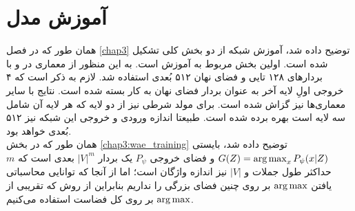 \section{آموزش مدل}
همان طور که در فصل \ref{chap3} توضیح داده شد، آموزش شبکه از دو بخش کلی تشکیل شده است. اولین بخش مربوط به آموزش \wae{} است. به این منظور از معماری \transformer{}در \encoder{} و \decoder{} با بردارهای  \embedding{} 
۱۲۸ تایی و فضای نهان ۵۱۲ بُعدی استفاده شد. لازم به ذکر است که ۴ خروجی اولِ لایه آخر \encoder{} به عنوان بردار فضای نهان به کار بسته شده است. نتایج با سایر معماری‌ها نیز گزاش شده‌ است. برای مولد شرطی نیز از دو لایه  که هر لایه آن شامل سه لایه  است بهره برده شده است. طبیعتا اندازه ورودی و خروجی این شبکه نیز ۵۱۲ بُعدی خواهد بود.
\\
همان طور که در بخش \ref{chap3:wae_training} توضیح داده شد، \decoder{} بایستی 
$G(Z) = \operatorname*{arg\,max}_{x} P_\psi(x|Z)$
و فضای خروجی $P_\psi$ یک بردار $|V|^{m}$ بعدی است که $m$ حداکثر طول جملات و $|V|$ نیز اندازه واژگان است؛ اما از آنجا که توانایی محاسباتی یافتن $\operatorname*{arg\,max}$ بر روی چنین فضای بزرگی را نداریم بنابراین از روش 
که تقریبی از $\operatorname*{arg\,max}$ بر روی کل فضاست استفاده می‌کنیم.
\iffalse
